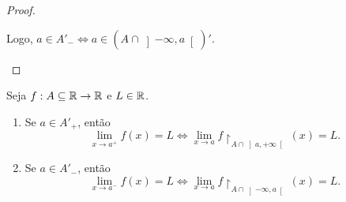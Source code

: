 \begin{proof}
\begin{enumerate}[leftmargin=*, align=left, label=\textbf{(\alph*)}]
\begin{itemize}
                \end{itemize}
            Logo, $a \in A'_- \Leftrightarrow a \in (A \cap \left]-\infty, a \right[)'$. \blackproof
        \end{enumerate}
\end{proof}

\begin{proposition}
    Seja $f : A \subseteq \mathbb{R} \to \mathbb{R}$ e $L \in \mathbb{R}$.
        \begin{enumerate}[leftmargin=*, align=left, label=\textbf{(\alph*)}]
            \item Se $a \in A'_+$, então
                \[
                    \lim_{x \to a^+} f(x) = L \Leftrightarrow \lim_{x \to a} f \restriction_{A \cap \left]a,+\infty \right[ } (x) = L.
                \]
            \item Se $a \in A'_-$, então
                \[
                    \lim_{x \to a^-} f(x) = L \Leftrightarrow \lim_{x \to a} f \restriction_{A \cap \left]-\infty, a \right[ } (x) = L.
                \]
        \end{enumerate}
\end{proposition}

